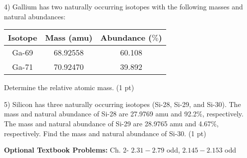 \documentclass[12pt]{article}
\begin{document}
\vspace{1in}

4) Gallium has two naturally occurring isotopes with the following masses and
natural abundances:
\begin{table}[H]
  \begin{tabular}{ccc}
    Isotope & Mass (amu) & Abundance ($\%$) \\
    \hline
    Ga-69 & 68.92558 & 60.108 \\
    Ga-71 & 70.92470 & 39.892
  \end{tabular}
\end{table}
Determine the relative atomic mass. (1 pt)


\vspace{1in}

5) Silicon has three naturally occurring isotopes (Si-28, Si-29, and Si-30).
The mass and natural abundance of Si-28 are 27.9769 amu and 92.2$\%$, respectively.
The mass and natural abundance of Si-29 are 28.9765 amu and 4.67$\%$, respectively.
Find the mass and natural abundance of Si-30. (1 pt)


\vfill

\textbf{Optional Textbook Problems:} Ch. 2- $2.31-2.79$ odd, $2.145-2.153$ odd
\end{document}
